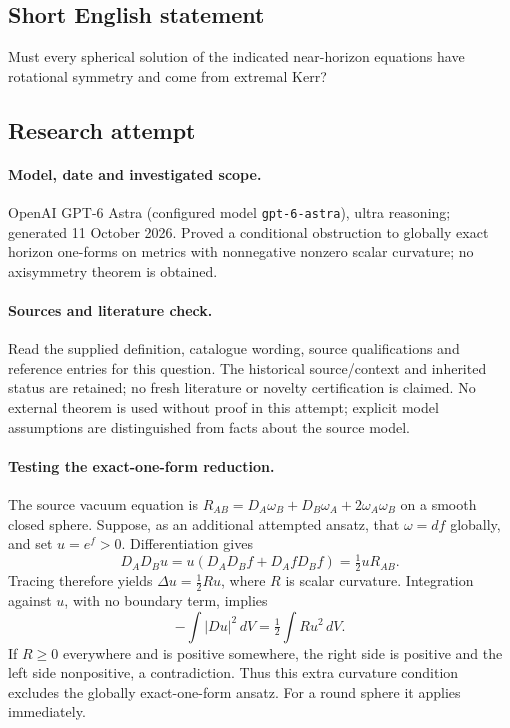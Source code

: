 \documentclass[11pt]{article}
\begin{document}
\subsection{Short English statement}
Must every spherical solution of the indicated near-horizon equations have rotational symmetry and come from extremal Kerr?
\subsection{Research attempt}
\paragraph{Model, date and investigated scope.}
OpenAI GPT-6 Astra (configured model \texttt{gpt-6-astra}), ultra reasoning; generated 11 October 2026. Proved a conditional obstruction to globally exact horizon one-forms on metrics with nonnegative nonzero scalar curvature; no axisymmetry theorem is obtained.

\paragraph{Sources and literature check.}
Read the supplied definition, catalogue wording, source qualifications and reference entries for this question. The historical source/context and inherited status are retained; no fresh literature or novelty certification is claimed. No external theorem is used without proof in this attempt; explicit model assumptions are distinguished from facts about the source model.

\paragraph{Testing the exact-one-form reduction.} The source vacuum equation is \(R_{AB}=D_A\omega_B+D_B\omega_A+2\omega_A\omega_B\) on a smooth closed sphere. Suppose, as an additional attempted ansatz, that \(\omega=df\) globally, and set \(u=e^f>0\). Differentiation gives
\[
 D_AD_Bu=u(D_AD_Bf+D_AfD_Bf)=\tfrac12uR_{AB}.
\]
Tracing therefore yields \(\Delta u=\tfrac12Ru\), where \(R\) is scalar curvature. Integration against \(u\), with no boundary term, implies
\[
 -\int|Du|^2\,dV=\tfrac12\int R u^2\,dV.
\]
If \(R\ge0\) everywhere and is positive somewhere, the right side is positive and the left side nonpositive, a contradiction. Thus this extra curvature condition excludes the globally exact-one-form ansatz. For a round sphere it applies immediately.
\end{document}
